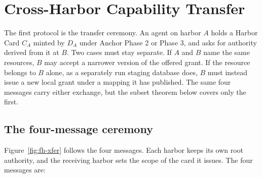 \documentclass[11pt,a4paper]{article}
\theoremstyle{definition}
\theoremstyle{remark}
\begin{document}
\section{Cross-Harbor Capability Transfer}\label{sec:fh-xfer}

The first protocol is the transfer ceremony. An agent on harbor $A$ holds a Harbor Card $C_A$ minted by $D_A$ under Anchor Phase 2 or Phase 3, and asks for authority derived from it at $B$. Two cases must stay separate. If $A$ and $B$ name the
same resources, $B$ may accept a narrower version of the offered grant. If the
resource belongs to $B$ alone, as a separately run staging database does, $B$
must instead issue a new local grant under a mapping it has published. The same
four messages carry either exchange, but the subset theorem below covers only the first.



\subsection{The four-message ceremony}\label{sec:fh-xfer-ceremony}

Figure~\ref{fig:fh-xfer} follows the four messages. Each harbor keeps its
own root authority, and the receiving harbor sets the scope of the card it
issues. The four messages are:
\end{document}
